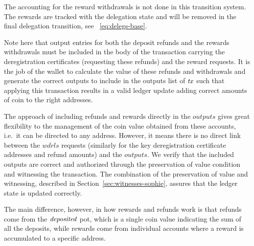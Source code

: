 The accounting for the reward withdrawals is not done in this transition system.
The rewards are tracked with the delegation state and will
be removed in the final delegation transition, see ~\ref{eq:delegs-base}.

Note here that output entries for both the deposit refunds and the rewards
withdrawals must be included in the body of the transaction
carrying the deregistration certificates (requesting these refunds) and the
reward requests. It is the job
of the wallet to calculate the value of these refunds and withdrawals and
generate the correct outputs to include in the outputs list of $\mathit{tx}$ such
that applying this transaction results in a
valid ledger update adding correct amounts of coin to the right addresses.

The approach of including refunds and rewards directly in the $outputs$ gives
great flexibility to the management of the coin value obtained from these
accounts, i.e.~it can be directed to any address. However, it means there is no
direct link between the $wdrls$ requests (similarly for the key deregistration
certificate addresses and refund amounts) and the $outputs$. We verify that
the included outputs are correct and authorized through the preservation of value condition
and witnessing the transaction. The combination of the
preservation of value and witnessing, described in Section~\ref{sec:witnesses-sophie},
assures that the ledger state is updated correctly.

The main difference, however, in how rewards and refunds work is that refunds
come from the $\mathit{deposited}$ pot, which is a single coin value indicating
the sum of all the deposits, while rewards come from individual
accounts where a reward is accumulated to a specific address.

